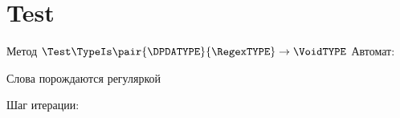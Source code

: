 \section{Test}
\begin{frame}{Метод $\Test\TypeIs\pair{\DPDATYPE}{\RegexTYPE}\to\VoidTYPE$}
    Автомат:


    Слова порождаются регуляркой 

    Шаг итерации:



\end{frame}
